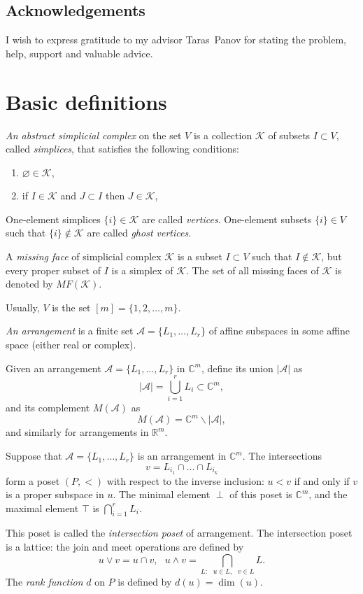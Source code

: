\documentclass[a4paper,12pt]{amsart}
\newcommand{\K}{\mathcal K}
\newcommand{\RR}{\mathbb R}
\newcommand{\CC}{\mathbb C}
\theoremstyle{definition}
\theoremstyle{remark}
\numberwithin{equation}{section}
\begin{document}
\subsection*{Acknowledgements} I wish to express gratitude to my advisor Taras~Panov for stating the problem, help, support and valuable advice.

\section{Basic definitions}
\textit{An abstract simplicial complex} on the set $V$ is a collection $\K$ of subsets $I \subset V$, called \textit{simplices},
that satisfies the following conditions:
\begin{enumerate}
	\item[$\bullet$] $\varnothing \in \K$,
	\item[$\bullet$] if $I \in \K$ and $J \subset I$ then $J \in \K$,
\end{enumerate}
One-element simplices $\{ i \} \in \K$ are called \textit{vertices}. One-element subsets $\{i \} \in V$ such that $\{i \} \notin \K$ are called \textit{ghost vertices}.

A \textit{missing face} of simplicial complex $\K$ is a subset $I \subset V$ such that $I \notin \K$, but every
proper subset of $I$ is a simplex of $\K$.
The set of all missing faces of $\K$ is denoted by $MF(\K)$.

Usually, $V$ is the set $[m] = \{1, 2, \dots, m \}$.

{\it An arrangement} is a finite set $\mathcal{A} = \{L_1, \dots, L_r \}$ of affine subspaces in some affine space (either real or complex).

Given an arrangement $\mathcal{A} = \{L_1, \dots, L_r\}$ in $\CC^m$, define its union $|\mathcal{A}|$ as
$$|\mathcal{A}| = \bigcup_{i = 1}^r L_i \subset \CC^m,$$
and its complement $M(\mathcal{A})$ as
$$M(\mathcal{A}) = \CC^m \backslash |\mathcal{A}|,$$
and similarly for arrangements in $\RR^m$.

Suppose that $\mathcal{A} = \{L_1, \dots, L_r \}$ is an arrangement in $\CC^m$. 
The intersections
	$$v = L_{i_1} \cap \dots \cap L_{i_k}$$
form a poset $(P, <)$ with respect to the inverse inclusion:
$u < v$ if and only if $v$ is a proper subspace in $u$.
The minimal element $\perp$ of this poset is $\CC^m$, 
and the maximal element $\top$ is $\bigcap_{i = 1}^r L_i$.

This poset is called the {\it intersection poset} of arrangement. 
The intersection poset is a lattice: the join and meet operations are defined by
$$u \vee v = u \cap v, \text{	} u \wedge v = \bigcap_{L: \text{ } u \in L,\text{ } v \in L} L.$$
The \textit{rank function} $d$ on $P$ is defined by
$d(u) = \dim(u)$.
\end{document}
